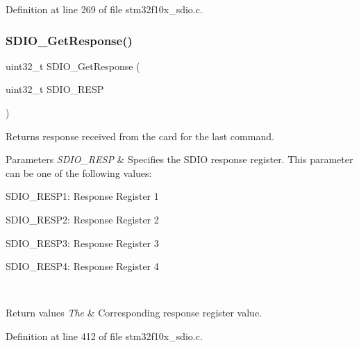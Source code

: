Definition at line 269 of file stm32f10x\+\_\+sdio.\+c.

\mbox{\label{group___s_d_i_o___private___functions_ga5c1e859511840e8cca6a9a768bce220b}} 
\subsubsection{\texorpdfstring{S\+D\+I\+O\+\_\+\+Get\+Response()}{SDIO\_GetResponse()}}
{\footnotesize\ttfamily uint32\+\_\+t S\+D\+I\+O\+\_\+\+Get\+Response (\begin{DoxyParamCaption}\item[{uint32\+\_\+t}]{S\+D\+I\+O\+\_\+\+R\+E\+SP }\end{DoxyParamCaption})}



Returns response received from the card for the last command. 


\begin{DoxyParams}{Parameters}
{\em S\+D\+I\+O\+\_\+\+R\+E\+SP} & Specifies the S\+D\+IO response register. This parameter can be one of the following values\+: \begin{DoxyItemize}
\item S\+D\+I\+O\+\_\+\+R\+E\+S\+P1\+: Response Register 1 \item S\+D\+I\+O\+\_\+\+R\+E\+S\+P2\+: Response Register 2 \item S\+D\+I\+O\+\_\+\+R\+E\+S\+P3\+: Response Register 3 \item S\+D\+I\+O\+\_\+\+R\+E\+S\+P4\+: Response Register 4 \end{DoxyItemize}
\\
\hline
\end{DoxyParams}

\begin{DoxyRetVals}{Return values}
{\em The} & Corresponding response register value. \\
\hline
\end{DoxyRetVals}


Definition at line 412 of file stm32f10x\+\_\+sdio.\+c.

\mbox{\label{group___s_d_i_o___private___functions_gad40764a8e37c0ed5c9141ae338ff0203}} 
